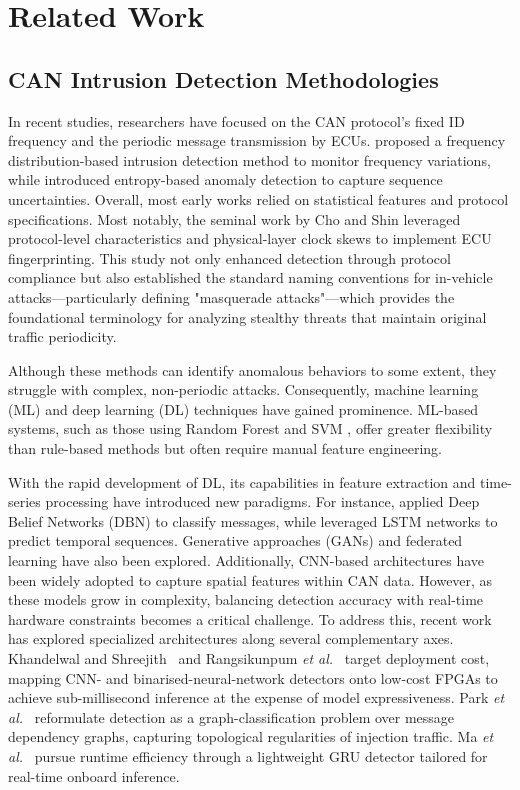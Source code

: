 \documentclass[lettersize,journal]{IEEEtran}
\begin{document}
\section{Related Work}
\subsection{CAN Intrusion Detection Methodologies}
In recent studies, researchers have focused on the CAN protocol's fixed ID frequency and the periodic message transmission by ECUs. \cite{b7} proposed a frequency distribution-based intrusion detection method to monitor frequency variations, while \cite{b35,b42} introduced entropy-based anomaly detection to capture sequence uncertainties. Overall, most early works relied on statistical features \cite{b39, b40, b41, b47} and protocol specifications. Most notably, the seminal work by Cho and Shin \cite{b37} leveraged protocol-level characteristics and physical-layer clock skews to implement ECU fingerprinting. This study not only enhanced detection through protocol compliance but also established the standard naming conventions for in-vehicle attacks—particularly defining "masquerade attacks"—which provides the foundational terminology for analyzing stealthy threats that maintain original traffic periodicity.

Although these methods can identify anomalous behaviors to some extent, they struggle with complex, non-periodic attacks. Consequently, machine learning (ML) and deep learning (DL) techniques have gained prominence. ML-based systems, such as those using Random Forest and SVM \cite{b38}, offer greater flexibility than rule-based methods but often require manual feature engineering.

With the rapid development of DL, its capabilities in feature extraction and time-series processing have introduced new paradigms. For instance, \cite{b19} applied Deep Belief Networks (DBN) to classify messages, while \cite{b43} leveraged LSTM networks to predict temporal sequences. Generative approaches (GANs) \cite{b21} and federated learning \cite{b46, b47} have also been explored. Additionally, CNN-based architectures \cite{b48, b49, b50} have been widely adopted to capture spatial features within CAN data. However, as these models grow in complexity, balancing detection accuracy with real-time hardware constraints becomes a critical challenge. To address this, recent work has explored specialized 
architectures along several complementary axes. Khandelwal 
and Shreejith~\cite{b62} and Rangsikunpum 
\textit{et al.}~\cite{b63} target 
deployment cost, mapping CNN- and binarised-neural-network 
detectors onto low-cost FPGAs to achieve sub-millisecond 
inference at the expense of model expressiveness. Park 
\textit{et al.}~\cite{b64} reformulate detection 
as a graph-classification problem over message dependency 
graphs, capturing topological regularities of injection 
traffic. Ma \textit{et al.}~\cite{b65} pursue runtime 
efficiency through a lightweight GRU detector tailored for 
real-time onboard inference.
\end{document}
